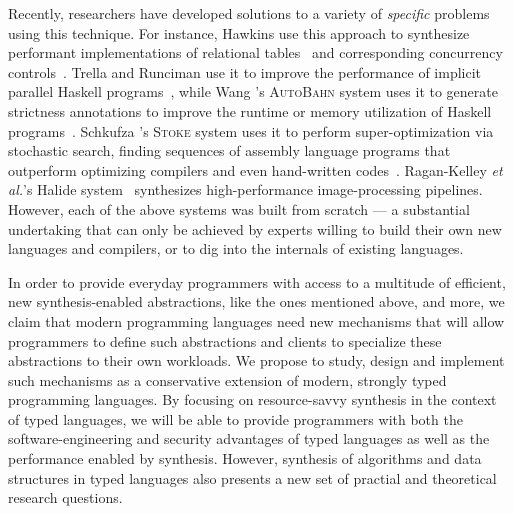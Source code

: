 Recently, researchers have developed solutions to a variety of \emph{specific} problems
using this technique.
For instance, Hawkins \etal{} use this approach to synthesize
performant implementations of relational tables~\cite{data-rep-synth}
and corresponding concurrency controls~\cite{conc-data-rep-synth}.
Trella and Runciman use it to improve the performance of implicit parallel
Haskell programs~\cite{implicit-parallel}, while
Wang \etal{}'s \textsc{AutoBahn} system uses it to generate strictness
annotations to improve the runtime or memory utilization of Haskell
programs~\cite{autobahn}.  Schkufza \etal{}'s \textsc{Stoke} system
uses it to perform super-optimization via stochastic search, finding
sequences of assembly language programs that outperform optimizing
compilers and even hand-written codes~\cite{stochastic-superopt}.
Ragan-Kelley \emph{et al.}'s Halide system~\cite{Ragan-Kelley:Halide} 
synthesizes high-performance
image-processing pipelines.
However, each of the above systems was built from scratch --- a substantial undertaking
that can only be achieved by experts willing to build their own new languages and
compilers, or to dig into the internals of existing languages.  

In order to provide everyday programmers with access to a multitude of
efficient, new synthesis-enabled abstractions, like the ones mentioned
above, and more, we claim that modern programming languages need new
mechanisms that will allow programmers to define such abstractions and
clients to specialize these abstractions to their own workloads.
We propose to study, design and implement such mechanisms as a conservative extension
of modern, strongly typed programming languages.  By focusing on resource-savvy
synthesis in the context of typed languages, we will be able to provide programmers
with both the software-engineering and security advantages of typed languages as
well as the performance enabled by synthesis.  However, synthesis of algorithms
and data structures in typed languages also presents a new set of practial
and theoretical research questions.



